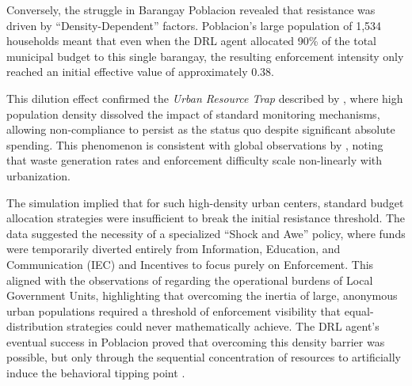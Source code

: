 Conversely, the struggle in Barangay Poblacion revealed that resistance was driven by ``Density-Dependent'' factors. Poblacion's large population of 1,534 households meant that even when the DRL agent allocated 90\% of the total municipal budget to this single barangay, the resulting enforcement intensity only reached an initial effective value of approximately 0.38. 

This dilution effect confirmed the \textit{Urban Resource Trap} described by \citet{Villanueva2021}, where high population density dissolved the impact of standard monitoring mechanisms, allowing non-compliance to persist as the status quo despite significant absolute spending. This phenomenon is consistent with global observations by \citet{Kaza2021}, noting that waste generation rates and enforcement difficulty scale non-linearly with urbanization.

The simulation implied that for such high-density urban centers, standard budget allocation strategies were insufficient to break the initial resistance threshold. The data suggested the necessity of a specialized ``Shock and Awe'' policy, where funds were temporarily diverted entirely from Information, Education, and Communication (IEC) and Incentives to focus purely on Enforcement. This aligned with the observations of \citet{Badua2022} regarding the operational burdens of Local Government Units, highlighting that overcoming the inertia of large, anonymous urban populations required a threshold of enforcement visibility that equal-distribution strategies could never mathematically achieve. The DRL agent's eventual success in Poblacion proved that overcoming this density barrier was possible, but only through the sequential concentration of resources to artificially induce the behavioral tipping point \citep{Centola2018}.